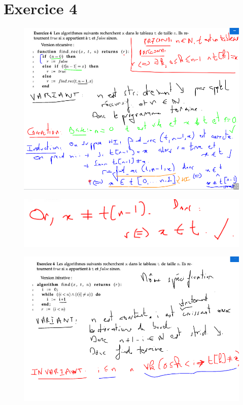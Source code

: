 \documentclass[a4paper]{article}
\begin{document}
\clearpage
\section*{Exercice 4}

\begin{figure}[!h]
  \centering
  \includegraphics[scale=0.5]{ex4_td5}
\end{figure}
\begin{figure}[!h]
  \centering
  \includegraphics[scale=0.5]{ex4bis_td5}
\end{figure}
\begin{figure}[!h]
  \centering
  \includegraphics[scale=0.5]{ex4ter_td5}
\end{figure}
\end{document}
